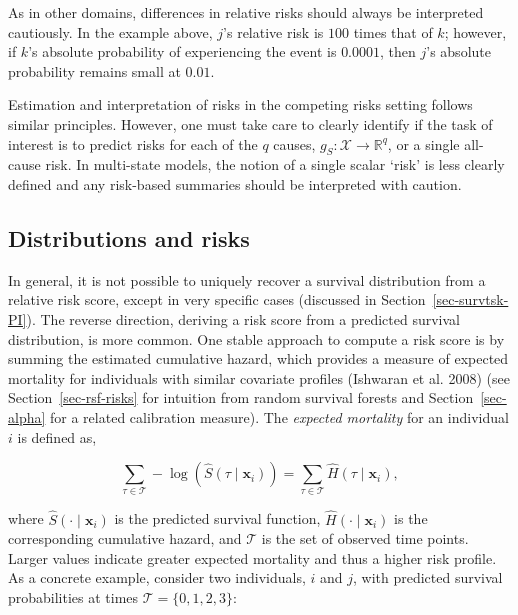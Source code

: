 \documentclass[
  letterpaper,
  krantz2]{style/krantz}
\begin{document}
As in other domains, differences in relative risks should always be
interpreted cautiously. In the example above, \(j\)'s relative risk is
\(100\) times that of \(k\); however, if \(k\)'s absolute probability of
experiencing the event is \(0.0001\), then \(j\)'s absolute probability
remains small at \(0.01\).

Estimation and interpretation of risks in the competing risks setting
follows similar principles. However, one must take care to clearly
identify if the task of interest is to predict risks for each of the
\(q\) causes, \(g_S: \mathcal{X}\rightarrow \mathbb{R}^q\), or a single
all-cause risk. In multi-state
models, the notion of a single scalar `risk'
is less clearly defined and any risk-based summaries should be
interpreted with caution.

\subsection{Distributions and risks}\label{distributions-and-risks}

In general, it is not possible to uniquely recover a survival
distribution from a relative risk score,
except in very specific cases (discussed in
Section~\ref{sec-survtsk-PI}). The reverse direction, deriving a risk
score from a predicted survival distribution, is more common. One stable
approach to compute a risk score is by summing the estimated cumulative
hazard, which provides a measure of expected mortality for individuals
with similar covariate profiles (Ishwaran et al.
2008) (see Section~\ref{sec-rsf-risks} for
intuition from random survival forests and Section~\ref{sec-alpha} for a
related calibration measure). The \emph{expected mortality} for an
individual \(i\) is defined as,

\[
\sum_{\tau \in \mathcal{T}} -\log(\hat{S}(\tau \mid \mathbf{x}_i)) = \sum_{\tau \in \mathcal{T}} \hat{H}(\tau \mid \mathbf{x}_i),
\]

where \(\hat{S}(\cdot \mid \mathbf{x}_i)\) is the predicted survival
function, \(\hat{H}(\cdot \mid \mathbf{x}_i)\) is the corresponding
cumulative hazard, and \(\mathcal{T}\) is the set of observed time
points. Larger values indicate greater expected mortality and thus a
higher risk profile. As a concrete example, consider two individuals,
\(i\) and \(j\), with predicted survival probabilities at times
\(\mathcal{T}= \{0,1,2,3\}\):
\end{document}
